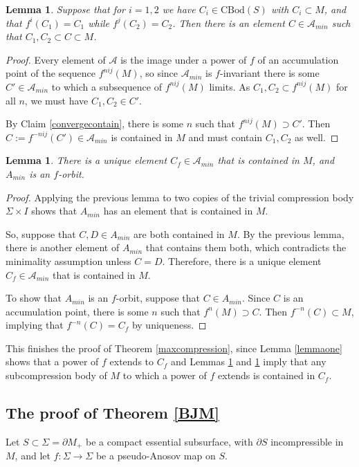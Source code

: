 \documentclass[12pt]{amsart}
\newtheorem{lemma}[theorem]{Lemma}
\theoremstyle{definition}
\theoremstyle{remark}
\newcommand{\CA}{\mathcal A} \newcommand{\CB}{\mathcal B}
\begin{document}
\begin {lemma}\label {lemmatwo}
Suppose that for $i=1,2$ we have $C_i\in \mathrm{CBod}(S) $ with $C_i\subset M $, and that $f^i(C_1)=C_1$ while $f^j(C_2)=C_2$. Then there is an element $C \in \mathcal A_{min} $ such that $C_1, C_2 \subset C \subset M  $.
\end{lemma}
\begin{proof}
Every element of $\CA$ is the image under a power of $f $ of an accumulation point of the sequence $f^{nij}(M)$, so since $\mathcal A_{min}$ is $f$-invariant there is some $C' \in \mathcal A_{min}$ to which a subsequence of $f^{nij}(M)$ limits.  As $C_1,C_2 \subset f^{nij}(M)$ for all $n $, we must have $C_1, C_2  \in C'$.

By Claim \ref {convergecontain}, there is some $n $ such that $f^{nij}(M) \supset C'$.  Then $C:=f^{-nij}(C') \in \mathcal A_{min} $ is contained in $M $ and must contain $C_1, C_2$ as well.
\end {proof}

\begin {lemma}\label {lemmathree}
There is a unique element $C_f \in \mathcal A_{min} $ that is contained in $M $, and $A_{min}$ is an $f$-orbit.
\end {lemma}
\begin {proof}
Applying the previous lemma to two copies of the trivial compression body $\Sigma \times I$ shows that $A_{min} $ has an element that is contained in $M $. 

So, suppose that $C,D \in A_{min} $ are both contained in $M $.  By the previous lemma, there is another element of $A_{min}$ that contains them both, which contradicts the minimality assumption unless $C = D $.  Therefore, there is a unique element $C_f \in \mathcal A_{min} $ that is contained in $M $.

To show that $A_{min}$ is an $f$-orbit, suppose that $C \in A_{min} $.  Since $C$ is an accumulation point, there is some $n $ such that $  f^n(M) \supset C$.  Then $f^{-n}(C) \subset M$, implying that $f^{-n}(C)=C_f $ by uniqueness.
\end {proof}

This finishes the proof of Theorem \ref{maxcompression}, since Lemma \ref {lemmaone} shows that a power of $f $ extends to $C_f $ and Lemmas \ref {lemmatwo} and \ref {lemmathree} imply that any subcompression body of $M$ to which a power of $f $ extends is contained in $C_f$.



\subsection{The proof of Theorem \ref{BJM}}\label{BJMsec}\label{BJMpf}
Let $S \subset \Sigma=\partial M_+$ be a compact essential subsurface, with $\partial S$ incompressible in $M$, and let $f: \Sigma \longrightarrow \Sigma$ be a pseudo-Anosov map on $S$. 
\end{document}
